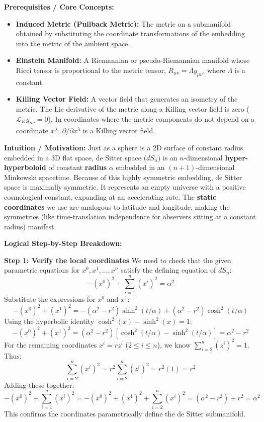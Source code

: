\begin{solution}
\textbf{Prerequisites / Core Concepts:}
\begin{itemize}
    \item \textbf{Induced Metric (Pullback Metric):} The metric on a submanifold obtained by substituting the coordinate transformations of the embedding into the metric of the ambient space.
    \item \textbf{Einstein Manifold:} A Riemannian or pseudo-Riemannian manifold whose Ricci tensor is proportional to the metric tensor, $R_{\mu\nu} = \Lambda g_{\mu\nu}$, where $\Lambda$ is a constant.
    \item \textbf{Killing Vector Field:} A vector field that generates an isometry of the metric. The Lie derivative of the metric along a Killing vector field is zero ($\mathcal{L}_K g_{\mu\nu} = 0$). In coordinates where the metric components do not depend on a coordinate $x^\lambda$, $\partial/\partial x^\lambda$ is a Killing vector field.
\end{itemize}

\textbf{Intuition / Motivation:}
Just as a sphere is a 2D surface of constant radius embedded in a 3D flat space, de Sitter space ($dS_n$) is an $n$-dimensional \textbf{hyper-hyperboloid} of constant \textbf{radius} $\alpha$ embedded in an $(n+1)$-dimensional Minkowski spacetime. Because of this highly symmetric embedding, de Sitter space is maximally symmetric. It represents an empty universe with a positive cosmological constant, expanding at an accelerating rate. The \textbf{static coordinates} we use are analogous to latitude and longitude, making the symmetries (like time-translation independence for observers sitting at a constant radius) manifest.

\textbf{Logical Step-by-Step Breakdown:}

\textbf{Step 1: Verify the local coordinates}
We need to check that the given parametric equations for $x^0, x^1, \dots, x^n$ satisfy the defining equation of $dS_n$:
\[ -(x^0)^2 + \sum_{i=1}^n (x^i)^2 = \alpha^2 \]
Substitute the expressions for $x^0$ and $x^1$:
\[ -(x^0)^2 + (x^1)^2 = -(\alpha^2 - r^2) \sinh^2(t/\alpha) + (\alpha^2 - r^2) \cosh^2(t/\alpha) \]
Using the hyperbolic identity $\cosh^2(x) - \sinh^2(x) = 1$:
\[ -(x^0)^2 + (x^1)^2 = (\alpha^2 - r^2) \left[ \cosh^2(t/\alpha) - \sinh^2(t/\alpha) \right] = \alpha^2 - r^2 \]
For the remaining coordinates $x^i = r z^i$ ($2 \le i \le n$), we know $\sum_{i=2}^n (z^i)^2 = 1$. Thus:
\[ \sum_{i=2}^n (x^i)^2 = r^2 \sum_{i=2}^n (z^i)^2 = r^2 (1) = r^2 \]
Adding these together:
\[ -(x^0)^2 + \sum_{i=1}^n (x^i)^2 = -(x^0)^2 + (x^1)^2 + \sum_{i=2}^n (x^i)^2 = (\alpha^2 - r^2) + r^2 = \alpha^2 \]
This confirms the coordinates parametrically define the de Sitter submanifold.


\end{solution}
